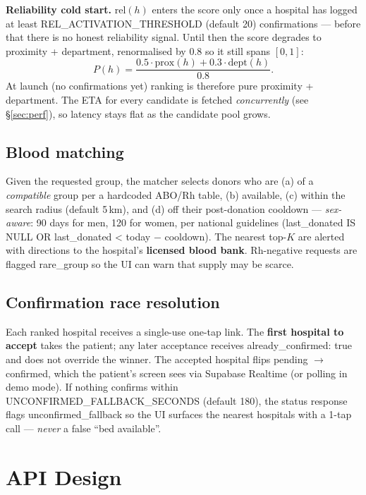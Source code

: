 \documentclass[11pt]{article}
\newcommand{\code}[1]{\colorbox{ghCodeBg}{\ttfamily\small #1}}
\begin{document}
\textbf{Reliability cold start.} $\mathrm{rel}(h)$ enters the score only once a
hospital has logged at least \code{REL\_ACTIVATION\_THRESHOLD} (default 20)
confirmations --- before that there is no honest reliability signal. Until then the
score degrades to proximity + department, renormalised by $0.8$ so it still spans
$[0,1]$:
\[
P(h) = \frac{0.5 \cdot \mathrm{prox}(h) + 0.3 \cdot \mathrm{dept}(h)}{0.8}.
\]
At launch (no confirmations yet) ranking is therefore pure proximity + department.
The ETA for every candidate is fetched \emph{concurrently} (see
\S\ref{sec:perf}), so latency stays flat as the candidate pool grows.

\subsection{Blood matching}
Given the requested group, the matcher selects donors who are (a) of a
\emph{compatible} group per a hardcoded ABO/Rh table, (b) available, (c) within the
search radius (default 5\,km), and (d) off their post-donation cooldown ---
\emph{sex-aware}: 90 days for men, 120 for women, per national guidelines
(\code{last\_donated IS NULL OR last\_donated < today $-$ cooldown}). The nearest
top-$K$ are alerted with directions to the hospital's \textbf{licensed blood bank}.
Rh-negative requests are flagged \code{rare\_group} so the UI can warn that supply
may be scarce.

\subsection{Confirmation race resolution}
Each ranked hospital receives a single-use one-tap link. The \textbf{first hospital
to accept} takes the patient; any later acceptance receives \code{already\_confirmed:
true} and does not override the winner. The accepted hospital flips
\code{pending $\rightarrow$ confirmed}, which the patient's screen sees via Supabase
Realtime (or polling in demo mode). If nothing confirms within
\code{UNCONFIRMED\_FALLBACK\_SECONDS} (default 180), the status response flags
\code{unconfirmed\_fallback} so the UI surfaces the nearest hospitals with a 1-tap
call --- \emph{never} a false ``bed available''.

\section{API Design}
\end{document}
